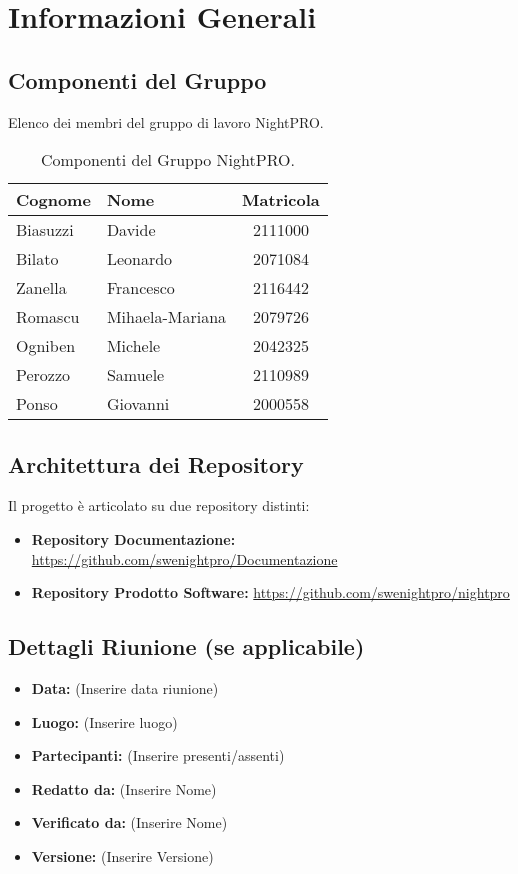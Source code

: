 \documentclass[a4paper, 11pt, oneside]{scrartcl} %
\begin{document}
\section{Informazioni Generali}

\subsection{Componenti del Gruppo}
Elenco dei membri del gruppo di lavoro NightPRO.

\begin{table}[h!]
\centering
\begin{tabular}{@{}llc@{}}
\toprule
\textbf{Cognome} & \textbf{Nome} & \textbf{Matricola} \\
\midrule
Biasuzzi & Davide & 2111000 \\
Bilato & Leonardo & 2071084 \\
Zanella & Francesco & 2116442 \\
Romascu & Mihaela-Mariana & 2079726 \\
Ogniben & Michele & 2042325 \\
Perozzo & Samuele & 2110989 \\
Ponso & Giovanni & 2000558 \\
\bottomrule
\end{tabular}
\caption{Componenti del Gruppo NightPRO.}
\end{table}

\subsection{Architettura dei Repository}
Il progetto è articolato su due repository distinti:
\begin{itemize}
    \item \textbf{Repository Documentazione:} \url{https://github.com/swenightpro/Documentazione}
    \item \textbf{Repository Prodotto Software:} \url{https://github.com/swenightpro/nightpro}
\end{itemize}

\subsection{Dettagli Riunione (se applicabile)}
\begin{itemize}
    \item \textbf{Data:} (Inserire data riunione)
    \item \textbf{Luogo:} (Inserire luogo)
    \item \textbf{Partecipanti:} (Inserire presenti/assenti)
    \item  \textbf{Redatto da: } (Inserire Nome)
    \item  \textbf{Verificato da:} (Inserire Nome)
    \item \textbf{Versione: } (Inserire Versione)
\end{itemize}
\end{document}
